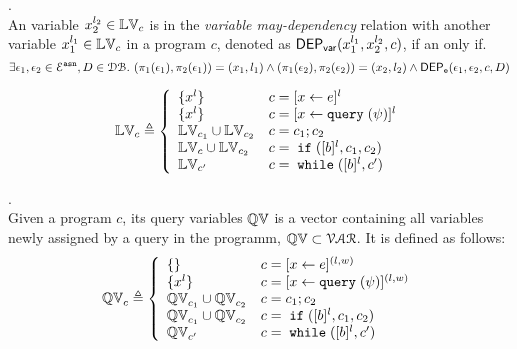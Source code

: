 %
\begin{defn}.
\label{def:var_dep}
\\
An variable ${x}_2^{l_2} \in \mathbb{LV}_{{c}}$ is in the \emph{variable may-dependency} relation with another
variable ${x}_1^{l_1} \in \mathbb{LV}_{{c}}$ in a program ${c}$, denoted as 
%
$\mathsf{DEP_{var}}({x}_1^{l_1}, {x}_2^{l_2}, {c})$, if an only if.
%
\[
\exists \mathtt{\epsilon}_1, \mathtt{\epsilon}_2 \in \mathcal{E}^{\mathtt{{asn}}}, D \in \mathcal{DB}. ~
(\pi_{1}{(\mathtt{\epsilon}_1)}, \pi_{2}{(\mathtt{\epsilon}_1)}) = ({x}_1, l_1)
\land
(\pi_{1}{(\mathtt{\epsilon}_2)}, \pi_{2}{(\mathtt{\epsilon}_2)}) = ({x}_2, l_2)
\land 
\mathsf{DEP_{\mathtt{e}}}(\mathtt{\epsilon}_1, \mathtt{\epsilon}_2, c, D)
\] 
%
%
\end{defn}
%
\begin{defn}
$$
  \lvar_{c} \triangleq
  \left\{
  \begin{array}{ll}
      \{{x}^l\}                   
      & {c} = [{\assign x e}]^{l} 
      \\
      \{{x}^l\}                   
      & {c} = [{\assign x \query(\qexpr)}]^{l} 
      \\
      \lvar_{{c_1}} \cup \lvar_{{c_2}}  
      & {c} = {c_1};{c_2}
      \\
      \lvar_{{c}} \cup \lvar_{{c_2}} 
      & {c} =\eif([\bexpr]^{l}, c_1, c_2) 
      \\
      \lvar_{{c}'}
      & {c}   = \ewhile ([\bexpr]^{l}, {c}')
\end{array}
\right.
$$
\end{defn}
%
\begin{defn}.
\\
Given a program $c$, its query variables $\mathbb{QV}$ is a vector containing all variables newly assigned by a query in the programm, $\mathbb{QV} \subset \mathcal{VAR}$.
It is defined as follows:
$$
  \qvar_{{c}} \triangleq
  \left\{
  \begin{array}{ll}
      \{\}                  
      & {c} = [{\assign x e}]^{(l, w)} 
      \\
      \{{x}^l\}                  
      & {c} = [{\assign x \query(\qexpr)}]^{(l, w)} 
      \\
      \qvar_{{c_1}} \cup \qvar_{{c_2}}  
      & {c} = {c_1};{c_2}
      \\
      \qvar_{{c_1}} \cup \qvar_{{c_2}} 
      & {c} =\eif([\bexpr]^{l}, c_1, c_2) 
      \\
      \qvar_{{c}'}
      & {c}   = \ewhile ([\bexpr]^{l}, {c}')
\end{array}
\right.
$$
\end{defn}
